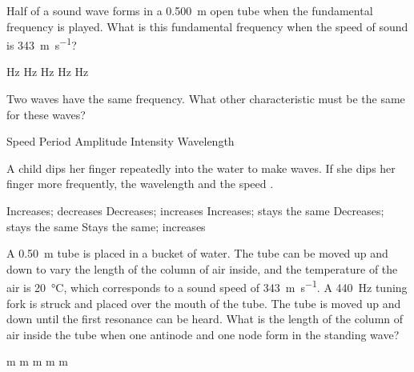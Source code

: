 \documentclass{../../../oss-ap12ibhl}
\begin{document}
\begin{questions}
  \question Half of a sound wave forms in a \SI{.500}{\metre} open tube when the
  fundamental frequency is played. What is this fundamental frequency when the
  speed of sound is \SI{343}{\metre\per\second}?
  \begin{choices}
     Hz
     Hz
     Hz
     Hz
     Hz
  \end{choices}
    
  \question Two waves have the same frequency. What other characteristic must be
  the same for these waves?
  \begin{choices}
    \choice Speed
    \choice Period
    \choice Amplitude
    \choice Intensity
    \choice Wavelength
  \end{choices}

  \question A child dips her finger repeatedly into the water to make waves. If
  she dips her finger more frequently, the wavelength \underline{\hspace{.3in}}
  and the speed \underline{\hspace{.3in}}.
  \begin{choices}
    \choice Increases; decreases
    \choice Decreases; increases
    \choice Increases; stays the same
    \choice Decreases; stays the same
    \choice Stays the same; increases
  \end{choices}
    
  \question A \SI{.50}{\metre} tube is placed in a bucket of water. The tube
  can be moved up and down to vary the length of the column of air inside, and
  the temperature of the air is \SI{20}{\celsius}, which corresponds to a sound
  speed of \SI{343}{\metre\per\second}. A \SI{440}{\hertz} tuning fork is
  struck and placed over the mouth of the tube. The tube is moved up and down
  until the first resonance can be heard. What is the length of the column of
  air inside the tube when one antinode and one node form in the standing wave?
  \begin{choices}
     m
     m
     m
     m
     m
  \end{choices}
  \newpage



\end{questions}
\end{document}
